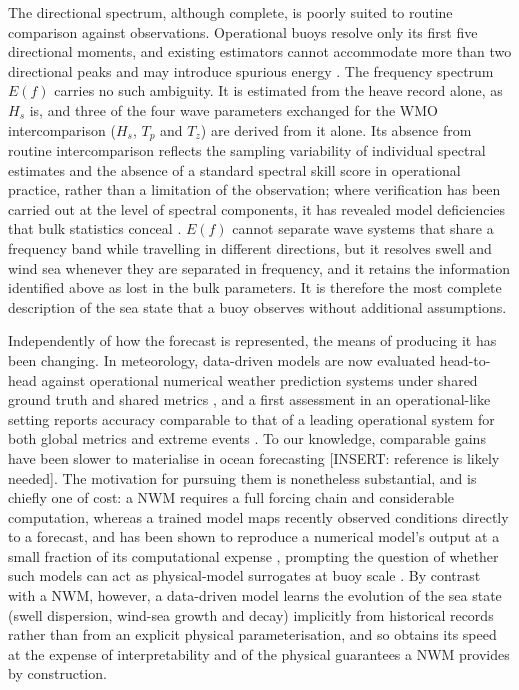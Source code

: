 The directional spectrum, although complete, is poorly suited to routine comparison against
observations. Operational buoys resolve only its first five directional moments, and existing estimators cannot accommodate more than two directional peaks and may introduce spurious energy \citep{gorman2018}. The frequency spectrum
$E(f)$ carries no such ambiguity. It is estimated from the heave record alone, as $H_s$ is, and
three of the four wave parameters exchanged for the WMO intercomparison ($H_s$, $T_p$ and $T_z$)
are derived from it alone. Its absence from routine intercomparison reflects the sampling
variability of individual spectral estimates and the absence of a standard spectral skill score
in operational practice, rather than a limitation of the observation; where verification has
been carried out at the level of spectral components, it has revealed model deficiencies that
bulk statistics conceal \citep{hanson2009pacific}. $E(f)$ cannot separate wave systems that share a
frequency band while travelling in different directions, but it resolves swell and wind sea
whenever they are separated in frequency, and it retains the information identified
above as lost in the bulk parameters. It is therefore the most complete description of the sea
state that a buoy observes without additional assumptions.

Independently of how the forecast is represented, the means of producing it has been changing. In
meteorology, data-driven models are now evaluated
head-to-head against operational numerical weather prediction systems under shared ground
truth and shared metrics \citep{rasp2024weatherbench2}, and a first assessment in an
operational-like setting reports accuracy comparable to that of a leading operational system for
both global metrics and extreme events \citep{benbouallegue2024rise}. To our knowledge, comparable gains have been
slower to materialise in ocean forecasting [INSERT: reference is likely needed]. The motivation for pursuing them is nonetheless
substantial, and is chiefly one of cost: a NWM requires a full forcing chain and
considerable computation, whereas a trained model maps recently observed conditions directly to a
forecast, and has been shown to reproduce a numerical model's output at a small fraction of its
computational expense \citep{james2018wave}, prompting the question of whether such models can act
as physical-model surrogates at buoy scale \citep{minuzzi2023lstm}. By contrast with a NWM, however, a data-driven model learns the evolution of the sea state (swell dispersion,
wind-sea growth and decay) implicitly from historical records rather than from an explicit
physical parameterisation, and so obtains its speed at the expense of interpretability and of the
physical guarantees a NWM provides by construction.


